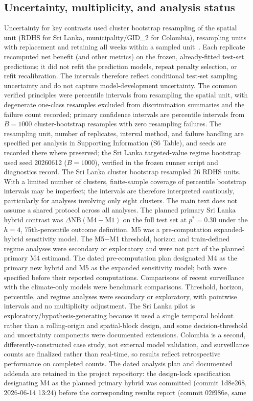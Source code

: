 \documentclass[11pt,a4paper]{article}
\begin{document}
\subsection{Uncertainty, multiplicity, and analysis status}
Uncertainty for key contrasts used cluster bootstrap resampling of the spatial unit (RDHS for Sri Lanka, municipality/GID\_2 for Colombia), resampling units with replacement and retaining all weeks within a sampled unit~\cite{CameronGelbachMiller2008}. Each replicate recomputed net benefit (and other metrics) on the frozen, already-fitted test-set predictions; it did not refit the prediction models, repeat penalty selection, or refit recalibration. The intervals therefore reflect conditional test-set sampling uncertainty and do not capture model-development uncertainty. The common verified principles were percentile intervals from resampling the spatial unit, with degenerate one-class resamples excluded from discrimination summaries and the failure count recorded; primary confidence intervals are percentile intervals from $B=1000$ cluster-bootstrap resamples with zero resampling failures. The resampling unit, number of replicates, interval method, and failure handling are specified per analysis in Supporting Information (S6 Table), and seeds are recorded there where preserved; the Sri Lanka targeted-value regime bootstrap used seed 20260612 ($B=1000$), verified in the frozen runner script and diagnostics record. The Sri Lanka cluster bootstrap resampled 26 RDHS units. With a limited number of clusters, finite-sample coverage of percentile bootstrap intervals may be imperfect; the intervals are therefore interpreted cautiously, particularly for analyses involving only eight clusters. The main text does not assume a shared protocol across all analyses. The planned primary Sri Lanka hybrid contrast was $\Delta\mathrm{NB}(\text{M4}-\text{M1})$ on the full test set at $p^*=0.30$ under the $h=4$, 75th-percentile outcome definition. M5 was a pre-computation expanded-hybrid sensitivity model. The M5$-$M1 threshold, horizon and train-defined regime analyses were secondary or exploratory and were not part of the planned primary M4 estimand. The dated pre-computation plan designated M4 as the primary new hybrid and M5 as the expanded sensitivity model; both were specified before their reported computations. Comparisons of recent surveillance with the climate-only models were benchmark comparisons. Threshold, horizon, percentile, and regime analyses were secondary or exploratory, with pointwise intervals and no multiplicity adjustment. The Sri Lanka pilot is exploratory/hypothesis-generating because it used a single temporal holdout rather than a rolling-origin and spatial-block design, and some decision-threshold and uncertainty components were documented extensions. Colombia is a second, differently-constructed case study, not external model validation, and surveillance counts are finalized rather than real-time, so results reflect retrospective performance on completed counts. The dated analysis plan and documented addenda are retained in the project repository: the design-lock specification designating M4 as the planned primary hybrid was committed (commit 1d8e268, 2026-06-14 13:24) before the corresponding results report (commit 02f986e, same 
\end{document}
